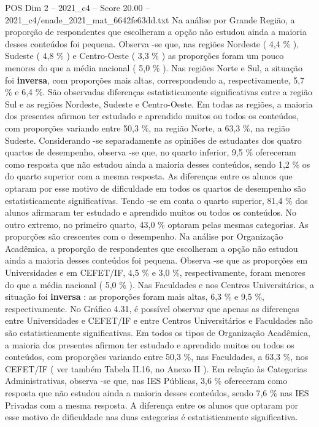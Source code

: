 \begin{textsample}{POS Dim 2 – 2021\_c4 – Score 20.00 – 2021\_c4/enade\_2021\_mat\_6642fe63dd.txt}
Na análise por Grande Região, a proporção de respondentes que escolheram a opção não estudou ainda a maioria desses conteúdos foi pequena.
Observa -se que, nas regiões Nordeste ( 4,4 \% ), Sudeste ( 4,8 \% ) e Centro-Oeste ( 3,3 \% ) as proporções foram um pouco menores do que a média nacional ( 5,0 \% ).
Nas regiões Norte e Sul, a situação foi \textbf{inversa}, com proporções mais altas, correspondendo a, respectivamente, 5,7 \% e 6,4 \%.
São observadas diferenças estatisticamente significativas entre a região Sul e as regiões Nordeste, Sudeste e Centro-Oeste.
Em todas as regiões, a maioria dos presentes afirmou ter estudado e aprendido muitos ou todos os conteúdos, com proporções variando entre 50,3 \%, na região Norte, a 63,3 \%, na região Sudeste.
Considerando -se separadamente as opiniões de estudantes dos quatro quartos de desempenho, observa -se que, no quarto inferior, 9,5 \% ofereceram como resposta que não estudou ainda a maioria desses conteúdos, sendo 1,2 \% os do quarto superior com a mesma resposta.
As diferenças entre os alunos que optaram por esse motivo de dificuldade em todos os quartos de desempenho são estatisticamente significativas.
Tendo -se em conta o quarto superior, 81,4 \% dos alunos afirmaram ter estudado e aprendido muitos ou todos os conteúdos.
No outro extremo, no primeiro quarto, 43,0 \% optaram pelas mesmas categorias.
As proporções são crescentes com o desempenho.
Na análise por Organização Acadêmica, a proporção de respondentes que escolheram a opção não estudou ainda a maioria desses conteúdos foi pequena.
Observa -se que as proporções em Universidades e em CEFET/IF, 4,5 \% e 3,0 \%, respectivamente, foram menores do que a média nacional ( 5,0 \% ).
Nas Faculdades e nos Centros Universitários, a situação foi \textbf{inversa} : as proporções foram mais altas, 6,3 \% e 9,5 \%, respectivamente.
No Gráfico 4.31, é possível observar que apenas as diferenças entre Universidades e CEFET/IF e entre Centros Universitários e Faculdades não são estatisticamente significativas.
Em todos os tipos de Organização Acadêmica, a maioria dos presentes afirmou ter estudado e aprendido muitos ou todos os conteúdos, com proporções variando entre 50,3 \%, nas Faculdades, a 63,3 \%, nos CEFET/IF ( ver também Tabela II.16, no Anexo II ).
Em relação às Categorias Administrativas, observa -se que, nas IES Públicas, 3,6 \% ofereceram como resposta que não estudou ainda a maioria desses conteúdos, sendo 7,6 \% nas IES Privadas com a mesma resposta.
A diferença entre os alunos que optaram por esse motivo de dificuldade nas duas categorias é estatisticamente significativa.

\end{textsample}
